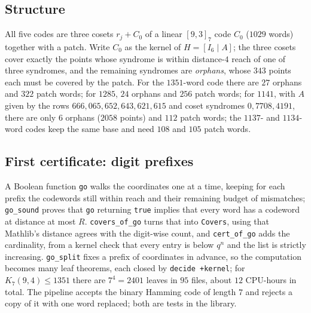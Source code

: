 \documentclass[11pt]{amsart}
\theoremstyle{definition}
\theoremstyle{remark}
\begin{document}
\subsection*{Structure}
All five codes are three cosets $r_j+C_0$ of a linear $[9,3]_7$ code $C_0$ ($1029$ words) together with a patch.
Write $C_0$ as the kernel of $H=[I_6\mid A]$; the three cosets cover exactly the points whose syndrome is within distance-$4$ reach of one of three syndromes, and the remaining syndromes are \emph{orphans}, whose $343$ points each must be covered by the patch.
For the $1351$-word code there are $27$ orphans and $322$ patch words; for $1285$, $24$ orphans and $256$ patch words; for $1141$, with $A$ given by the rows $666,065,652,643,621,615$ and coset syndromes $0, 7708, 4191$, there are only $6$ orphans ($2058$ points) and $112$ patch words; the $1137$- and $1134$-word codes keep the same base and need $108$ and $105$ patch words.

\subsection*{First certificate: digit prefixes}
A Boolean function \texttt{go} walks the coordinates one at a time, keeping for each prefix the codewords still within reach and their remaining budget of mismatches; \texttt{go\_\allowbreak sound} proves that \texttt{go} returning \texttt{true} implies that every word has a codeword at distance at most $R$.
\texttt{covers\_\allowbreak of\_\allowbreak go} turns that into \texttt{Covers}, using that Mathlib's distance agrees with the digit-wise count, and \texttt{cert\_\allowbreak of\_\allowbreak go} adds the cardinality, from a kernel check that every entry is below $q^n$ and the list is strictly increasing.
\texttt{go\_\allowbreak split} fixes a prefix of coordinates in advance, so the computation becomes many leaf theorems, each closed by \texttt{decide +kernel}; for $K_7(9,4)\le 1351$ there are $7^4=2401$ leaves in $95$ files, about $12$ CPU-hours in total.
The pipeline accepts the binary Hamming code of length $7$ and rejects a copy of it with one word replaced; both are tests in the library.
\end{document}
